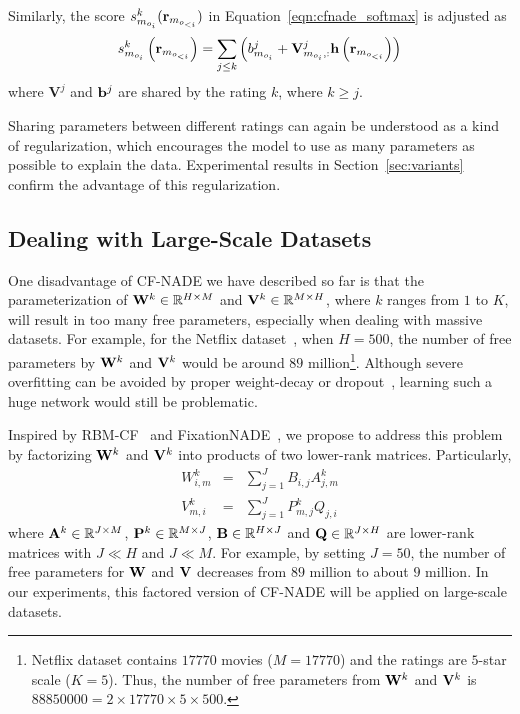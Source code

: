 \documentclass{article}
\newcommand{\cfnade}{CF-NADE\xspace}
\newcommand{\reals}{\mathbb{R}}
\begin{document}
Similarly, the score $s_{m_{o_i}}^{k}({\bf r}_{m_{o_{<i}}})$ in
Equation~\ref{eqn:cfnade_softmax} is adjusted as
\begin{equation}
s_{m_{o_i}}^{k}\left({\bf r}_{m_{o_{<i}}}\right) =\sum_{j\le k} \left(b^{j}_{m_{o_i}} +\mathbf{V}^{j}_{m_{o_i},:}\mathbf{h}\left ( {\bf r}_{m_{o_{<i}}} \right )\right)
    \label{eqn:score_shared}
\end{equation}
where $\mathbf{V}^j$ and ${\bf b}^{j}$ are shared by the rating $k$, where $k \ge j$.

Sharing parameters between different ratings can again be understood
as a kind of regularization, which encourages the model to use as many
parameters as possible to explain the data. Experimental results in
Section~\ref{sec:variants} confirm the advantage of this
regularization.




\subsection{Dealing with Large-Scale Datasets}
\label{sec:factored}
One disadvantage of \cfnade we have described so far is that the
parameterization of ${\bf W}^k \in \reals^{H\times M}$ and
${\bf V}^k \in \reals^{M\times H}$, where $k$ ranges from $1$ to $K$,
will result in too many free parameters, especially when dealing with
massive datasets. For example, for the Netflix
dataset~\citep{bennett2007netflix}, when $H=500$, the number of free
parameters by ${\bf W}^k$ and ${\bf V}^k$ would be around $89$
million\footnote{Netflix dataset contains $17770$ movies ($M=17770$)
  and the ratings are $5$-star scale ($K=5$). Thus, the number of free
  parameters from ${\bf W}^k$ and ${\bf V}^k$ is
  $88850000=2\times 17770\times 5\times 500$.}. Although severe
overfitting can be avoided by proper weight-decay or
dropout~\citep{srivastava2014dropout}, learning such a huge network
would still be problematic.


Inspired by RBM-CF~\citep{salakhutdinov2007restricted} and
FixationNADE~\citep{zheng2014neural}, we propose to address this
problem by factorizing ${\bf W}^k$ and ${\bf V}^k$ into products of
two lower-rank matrices. Particularly,
\begin{eqnarray}
W_{i,m}^k &=& \sum_{j=1}^J B_{i,j}A_{j,m}^k\label{eqn:fact_W}\\
V_{m,i}^k &=& \sum_{j=1}^J P_{m,j}^k Q_{j,i}\label{eqn:fact_V}
\end{eqnarray}
where ${\bf A}^k\in \reals^{J\times M}$,
${\bf P}^k\in \reals^{M\times J}$, ${\bf B}\in \reals^{H\times J}$ and
${\bf Q}\in \reals^{J\times H}$ are lower-rank matrices with $J\ll H$
and $J\ll M$. For example, by setting $J=50$, the number of free
parameters for $\bf W$ and $\bf V$ decreases from $89$ million to
about $9$ million. In our experiments, this factored version of \cfnade
will be applied on large-scale datasets.
\end{document}
